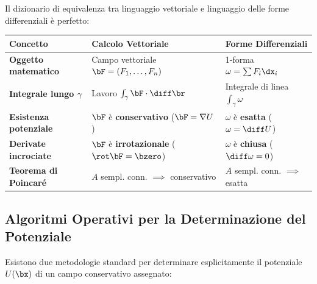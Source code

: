 Il dizionario di equivalenza tra linguaggio vettoriale e linguaggio delle forme differenziali è perfetto:
\begin{center}
\begin{tabularx}{\textwidth}{lXX}
\toprule
\textbf{Concetto} & \textbf{Calcolo Vettoriale} & \textbf{Forme Differenziali} \\
\midrule
\textbf{Oggetto matematico} & Campo vettoriale $\bF = (F_1, \dots, F_n)$ & 1-forma $\omega = \sum F_i \dx_i$ \\
\textbf{Integrale lungo $\gamma$} & Lavoro $\int_\gamma \bF \cdot \diff\br$ & Integrale di linea $\int_\gamma \omega$ \\
\textbf{Esistenza potenziale} & $\bF$ è \textbf{conservativo} ($\bF = \nabla U$) & $\omega$ è \textbf{esatta} ($\omega = \diff U$) \\
\textbf{Derivate incrociate} & $\bF$ è \textbf{irrotazionale} ($\rot\bF = \bzero$) & $\omega$ è \textbf{chiusa} ($\diff \omega = 0$) \\
\textbf{Teorema di Poincaré} & $A$ sempl. conn. $\implies$ conservativo & $A$ sempl. conn. $\implies$ esatta \\
\bottomrule
\end{tabularx}
\end{center}

\subsection{Algoritmi Operativi per la Determinazione del Potenziale}

Esistono due metodologie standard per determinare esplicitamente il potenziale $U(\bx)$ di un campo conservativo assegnato:

